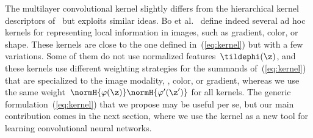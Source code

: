 The multilayer convolutional kernel slightly differs from the hierarchical kernel descriptors
of~\cite{bo2011} but exploits similar ideas. Bo et al.~\cite{bo2011} define
indeed several ad hoc kernels for representing local information in images,
such as gradient, color, or shape. These kernels are close to the one
defined in~(\ref{eq:kernel}) but with a few variations. Some of them do not
use normalized features~$\tildephi(\z)$, and these kernels use different
weighting strategies for the summands of~(\ref{eq:kernel}) that are specialized
to the image modality, \eg, color, or gradient, whereas we use the same
weight~$\normH{\varphi(\z)}  \normH{\varphi'(\z')}$ for all kernels. The generic
formulation~(\ref{eq:kernel}) that we propose may be useful per
se, but our main contribution comes in the next section, where we use the  
kernel as a new tool for learning convolutional neural networks.

